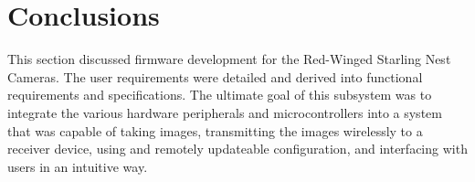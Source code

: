 \documentclass[class=report,11pt,crop=false]{standalone}
\begin{document}





\section{Conclusions}

This section discussed firmware development for the Red-Winged Starling Nest Cameras. The user requirements were detailed and derived into functional requirements and specifications. The ultimate goal of this subsystem was to integrate the various hardware peripherals and microcontrollers into a system that was capable of taking images, transmitting the images wirelessly to a receiver device, using and remotely updateable configuration, and interfacing with users in an intuitive way. 
\end{document}
